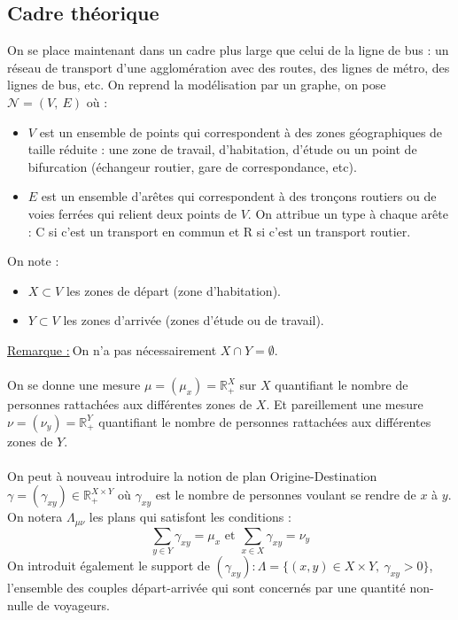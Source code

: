 \documentclass[12pt]{article}
\newcommand{\R}{\mathbb{R}}
\newcommand{\rmq}{\underline{Remarque :}}
\begin{document}
\subsection{Cadre théorique}
On se place maintenant dans un cadre plus large que celui de la ligne de bus : un réseau de transport d'une agglomération avec des routes, des lignes de métro, des lignes de bus, etc. On reprend la modélisation par un graphe, on pose $\mathcal{N} = (V,\:E)$ où :
\begin{itemize}
    \item $V$ est un ensemble de points qui correspondent à des zones géographiques de taille réduite : une zone de travail, d'habitation, d'étude ou un point de bifurcation (échangeur routier, gare de correspondance, etc).\\
    \item $E$ est un ensemble d'arêtes qui correspondent à des tronçons routiers ou de voies ferrées qui relient deux points de $V$. On attribue un type à chaque arête : C si c'est un transport en commun et R si c'est un transport routier.\\
\end{itemize}
On note :
\begin{itemize}
    \item $X \subset V$ les zones de départ (zone d'habitation).\\
    \item  $Y \subset V$ les zones d'arrivée (zones d'étude ou de travail).\\
\end{itemize}
\rmq $\:$On n'a pas nécessairement $X \cap Y = \emptyset$.\\
\\
On se donne une mesure $\mu = (\mu_x) = \R^X_+$ sur $X$ quantifiant le nombre de personnes rattachées aux différentes zones de $X$. Et pareillement une mesure $\nu = (\nu_y) = \R^Y_+$ quantifiant le nombre de personnes rattachées aux différentes zones de $Y$.\\
\\
On peut à nouveau introduire la notion de plan Origine-Destination $\gamma = (\gamma_{xy}) \in \R^{X\times Y}_+$ où $\gamma_{xy}$ est le nombre de personnes voulant se rendre de $x$ à $y$. On notera $\Lambda_{\mu \nu}$ les plans qui satisfont les conditions :
\[
\sum_{y \in Y} \gamma_{xy}= \mu_x \text{ et } \sum_{x \in X} \gamma_{xy}= \nu_y
\]
On introduit également le support de $(\gamma_{xy}) : \Lambda = \{(x,y) \in X\times Y, \: \gamma_{xy} > 0\}$, l'ensemble des couples départ-arrivée qui sont concernés par une quantité non-nulle de voyageurs.\\
\end{document}
